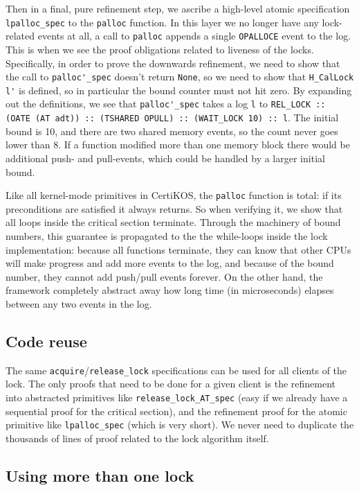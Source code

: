 Then in a final, pure refinement step, we ascribe a high-level atomic
specification \lstinline$lpalloc_spec$ to the \lstinline$palloc$
function. In this layer we no longer have any lock-related events at
all, a call to \lstinline$palloc$ appends a single
\lstinline$OPALLOCE$ event to the log. This is when we see the
proof obligations related to liveness of the locks.
Specifically, in order to prove the downwards refinement, we need to
show that the call to \lstinline$palloc'_spec$ doesn't return
\lstinline$None$, so we need to show that \lstinline$H_CalLock l'$ is
defined, so in particular the bound counter must not hit zero.
By expanding out the definitions, we see that
\lstinline$palloc'_spec$ takes a log \lstinline$l$ to
\lstinline$REL_LOCK :: (OATE (AT adt)) :: (TSHARED OPULL) :: (WAIT_LOCK 10) :: l$.
The initial bound is 10, and there are two shared memory events, so the
count never goes lower than 8. If a function modified more than one
memory block there would be additional push- and pull-events, which
could be handled by a larger initial bound.

Like all kernel-mode primitives in CertiKOS, the \lstinline$palloc$ function is
total: if its preconditions are satisfied it always returns. So
when verifying it, we show that all loops inside the critical section
terminate. Through the machinery of bound numbers, this guarantee is
propagated to the the while-loops inside the lock implementation:
because all functions terminate, they can know that other CPUs will
make progress and add more events to the log, and because of the
bound number, they cannot add push/pull events forever. On the other
hand, the framework completely abstract away how long time (in microseconds) elapses
between any two events in the log.

\subsection{Code reuse} 
The same
\lstinline$acquire$/\lstinline$release_lock$ specifications can be
used for all clients of the lock. The only proofs that need to be done
for a given client is the refinement into abstracted primitives like
\lstinline$release_lock_AT_spec$ (easy if we already have a sequential
proof for the critical section), and the refinement proof for the
atomic primitive like \lstinline$lpalloc_spec$ (which is very
short). We never need to duplicate the thousands of lines of proof
related to the lock algorithm itself.

\subsection{Using more than one lock}

